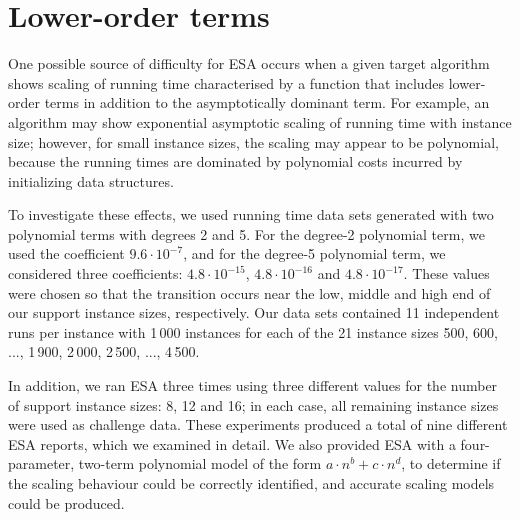 \documentclass[aic]{iosart2x}
\begin{document}
\section{Lower-order terms}
\label{sec:Lower Order Terms}

One possible source of difficulty for ESA occurs when a given target algorithm shows scaling of running time characterised by a function that includes lower-order terms in addition to the asymptotically dominant term.
For example, an algorithm may show exponential asymptotic scaling of running time with instance size; however, for small instance sizes, the scaling may appear to be polynomial, because the running times are dominated by polynomial costs incurred by initializing data structures. 

To investigate these effects, we used running time data sets generated with two polynomial terms with degrees 2 and 5. For the degree-2 polynomial term, we used the coefficient $9.6\cdot 10^{-7}$, and for the degree-5 polynomial term, we considered three coefficients: $4.8\cdot 10^{-15}$, $4.8\cdot 10^{-16}$ and $4.8 \cdot 10^{-17}$. 
These values were chosen so that the transition occurs near the low, middle and high end of our support instance sizes, respectively. 
Our data sets contained 11 independent runs per instance with 1\,000 instances for each of the 21 instance sizes 500, 600, ..., 1\,900, 2\,000, 2\,500, ..., 4\,500. 

In addition, we ran ESA three times using three different values for the number of support instance sizes: 8, 12 and 16; in each case, all remaining instance sizes were used as challenge data. 
These experiments produced a total of nine different ESA reports, which we examined in detail. 
We also provided ESA with a four-parameter, two-term polynomial model of the form $a\cdot n^b + c\cdot n^d$, to determine if the scaling behaviour could be correctly identified, and accurate scaling models could be produced.
\end{document}
